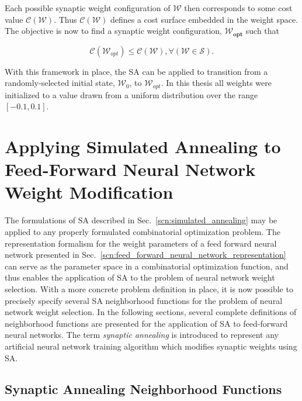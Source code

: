 \documentclass[11pt]{afthesis}
\begin{document}
	 
	 Each possible synaptic weight configuration of $\boldsymbol{\mathcal{W}}$ then corresponds to some cost value $\mathcal{C}(\boldsymbol{\mathcal{W}})$. Thus $\mathcal{C}(\boldsymbol{\mathcal{W}})$ defines a cost surface embedded in the weight space. The objective is now to find a synaptic weight configuration, $\boldsymbol{\mathcal{W}_{opt}}$ such that 
	 
	 \begin{equation*} \label{eq:optimal_definition}
	 \mathcal{C}(\boldsymbol{\mathcal{W}}_{opt}) \leq \mathcal{C}\left( \boldsymbol{\mathcal{W}}\right) , \forall\left(  \boldsymbol{\mathcal{W}} \in \boldsymbol{\mathcal{S}}\right) .
	 \end{equation*}
	 
	 \noindent With this framework in place, the SA can be applied to transition from a randomly-selected initial state, $\boldsymbol{\mathcal{W}}_0$, to $\boldsymbol{\mathcal{W}}_{opt}$. In this thesis all weights were initialized to a value drawn from a uniform distribution over the range $[-0.1,0.1]$.
	 

	\section{Applying Simulated Annealing to Feed-Forward Neural Network Weight Modification}
	
	The formulations of SA described in Sec.~\ref{scn:simulated_annealing} may be applied to any properly formulated combinatorial optimization problem. The representation formalism for the weight parameters of a feed forward neural network presented in Sec.~\ref{scn:feed_forward_neural_network_representation} can serve as the parameter space in a combinatorial optimization function, and thus enables the application of SA to the problem of neural network weight selection. With a more concrete problem definition in place, it is now possible to precisely specify several SA neighborhood functions for the problem of neural network weight selection. In the following sections, several complete definitions of neighborhood functions are presented for the application of SA to feed-forward neural networks. The term \textit{synaptic annealing} is introduced to represent any artificial neural network training algorithm which modifies synaptic weights using SA.
	
	
	\subsection{Synaptic Annealing Neighborhood Functions}
	\label{scn:classical_neighborhood}
	
\end{document}
